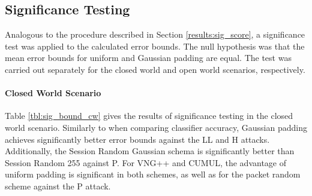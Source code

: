 \documentclass[
	ruledheaders=chapter,
	class=report,
	thesis={type=master, department=inf},
	accentcolor=1c,
	custommargins=true,
	marginpar=false,
	parskip=half-,
	fontsize=11pt,
]{tudapub}
\begin{document}
	\subsection{Significance Testing}
	
	Analogous to the procedure described in Section \ref{results:sig_score}, a significance test was applied to the calculated error bounds. The null hypothesis was that the mean error bounds for uniform and Gaussian padding are equal. The test was carried out separately for the closed world and open world scenarios, respectively.
	
	\paragraph{Closed World Scenario} Table \ref{tbl:sig_bound_cw} gives the results of significance testing in the closed world scenario. Similarly to when comparing classifier accuracy, Gaussian padding achieves significantly better error bounds against the LL and H attacks. Additionally, the Session Random Gaussian schema is significantly better than Session Random 255 against P. For VNG++ and CUMUL, the advantage of uniform padding is significant in both schemes, as well as for the packet random scheme against the P attack.
	
\end{document}
